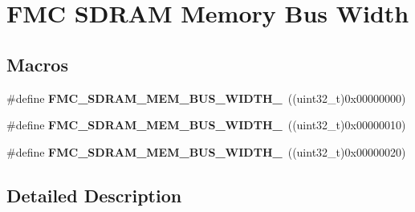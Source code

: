 \hypertarget{group___f_m_c___s_d_r_a_m___memory___bus___width}{}\section{F\+MC S\+D\+R\+AM Memory Bus Width}
\label{group___f_m_c___s_d_r_a_m___memory___bus___width}
\subsection*{Macros}
\begin{DoxyCompactItemize}
\item 
\#define {\bfseries F\+M\+C\+\_\+\+S\+D\+R\+A\+M\+\_\+\+M\+E\+M\+\_\+\+B\+U\+S\+\_\+\+W\+I\+D\+T\+H\+\_}~((uint32\+\_\+t)0x00000000)\hypertarget{group___f_m_c___s_d_r_a_m___memory___bus___width_ga851dfc858c936259fc165d9819830a17}{}\label{group___f_m_c___s_d_r_a_m___memory___bus___width_ga851dfc858c936259fc165d9819830a17}

\item 
\#define {\bfseries F\+M\+C\+\_\+\+S\+D\+R\+A\+M\+\_\+\+M\+E\+M\+\_\+\+B\+U\+S\+\_\+\+W\+I\+D\+T\+H\+\_}~((uint32\+\_\+t)0x00000010)\hypertarget{group___f_m_c___s_d_r_a_m___memory___bus___width_gaf43c45a557d1dc59ecd807ba07111cbf}{}\label{group___f_m_c___s_d_r_a_m___memory___bus___width_gaf43c45a557d1dc59ecd807ba07111cbf}

\item 
\#define {\bfseries F\+M\+C\+\_\+\+S\+D\+R\+A\+M\+\_\+\+M\+E\+M\+\_\+\+B\+U\+S\+\_\+\+W\+I\+D\+T\+H\+\_}~((uint32\+\_\+t)0x00000020)\hypertarget{group___f_m_c___s_d_r_a_m___memory___bus___width_gae450977a4eadfe2e4d6d0a1aaa9990fa}{}\label{group___f_m_c___s_d_r_a_m___memory___bus___width_gae450977a4eadfe2e4d6d0a1aaa9990fa}

\end{DoxyCompactItemize}


\subsection{Detailed Description}
